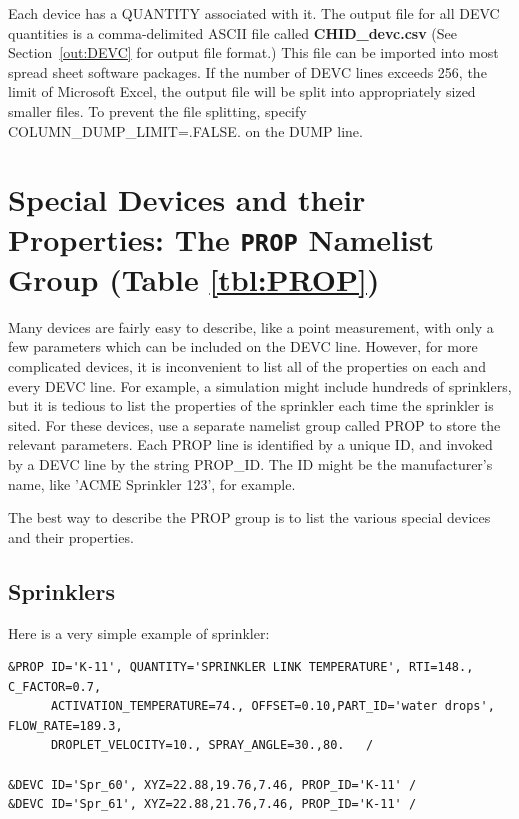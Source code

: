 \documentclass[11pt]{book}
\begin{document}
Each device has a {\ct QUANTITY} associated with it.
The output file for all {\ct DEVC} quantities is a comma-delimited
ASCII file called {\bf CHID\_devc.csv} (See Section~\ref{out:DEVC} for output file format.)
This file can be imported into most spread sheet software packages. If the number of {\ct DEVC} lines
exceeds 256, the limit of Microsoft Excel, the output file will be split into appropriately sized smaller
files. To prevent the file splitting, specify {\ct COLUMN\_DUMP\_LIMIT=.FALSE.} on the {\ct DUMP} line.








\section{Special Devices and their Properties: The \texorpdfstring{{\tt PROP}}{PROP} Namelist Group (Table \ref{tbl:PROP})}
\label{info:PROP}

Many devices are fairly easy to describe, like a point measurement, with only a few parameters which can be included on the
{\ct DEVC} line. However, for more complicated devices, it is inconvenient to list all of the properties on each and every
{\ct DEVC} line. For example, a simulation might include hundreds of sprinklers, but it is tedious to list the properties of the
sprinkler each time the sprinkler is sited. For these devices, use a separate namelist group called {\ct PROP} to store the relevant parameters.
Each {\ct PROP} line is identified by a unique {\ct ID}, and invoked by a {\ct DEVC} line by the string {\ct PROP\_ID}.
The {\ct ID} might be the manufacturer's
name, like {\ct 'ACME Sprinkler 123'}, for example.

The best way to describe the {\ct PROP} group is to list the various special devices and their properties.


\subsection{Sprinklers}
\label{info:sprinklers}

Here is a very simple example of sprinkler:

\footnotesize
\begin{verbatim}
&PROP ID='K-11', QUANTITY='SPRINKLER LINK TEMPERATURE', RTI=148., C_FACTOR=0.7,
      ACTIVATION_TEMPERATURE=74., OFFSET=0.10,PART_ID='water drops', FLOW_RATE=189.3,
      DROPLET_VELOCITY=10., SPRAY_ANGLE=30.,80.   /

&DEVC ID='Spr_60', XYZ=22.88,19.76,7.46, PROP_ID='K-11' /
&DEVC ID='Spr_61', XYZ=22.88,21.76,7.46, PROP_ID='K-11' /
\end{verbatim} \normalsize
\end{document}
